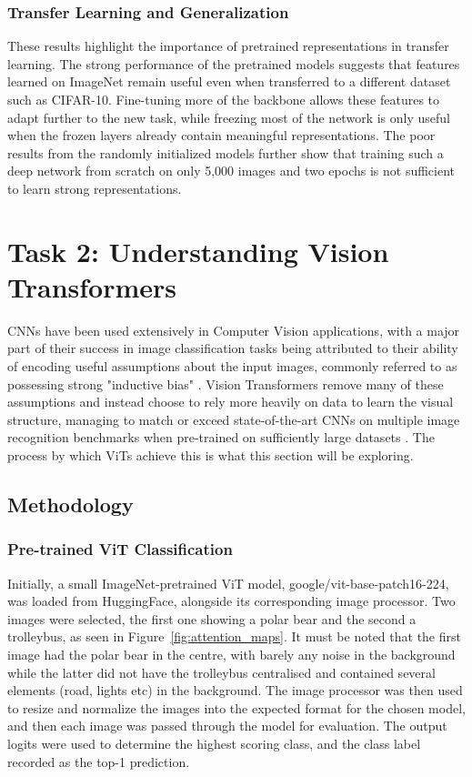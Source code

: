 \documentclass{article}
\begin{document}
\subsubsection{Transfer Learning and Generalization}
These results highlight the importance of pretrained representations in transfer learning. The strong performance of the pretrained models suggests that features learned on ImageNet remain useful even when transferred to a different dataset such as CIFAR-10. Fine-tuning more of the backbone allows these features to adapt further to the new task, while freezing most of the network is only useful when the frozen layers already contain meaningful representations. The poor results from the randomly initialized models further show that training such a deep network from scratch on only 5,000 images and two epochs is not sufficient to learn strong representations.


\section{Task 2: Understanding Vision Transformers}

CNNs have been used extensively in Computer Vision applications, with a major part of their success in image classification tasks being attributed to their ability of encoding useful assumptions about the input images, commonly referred to as possessing strong "inductive bias" \citep{dosovitskiy2021image}. Vision Transformers remove many of these assumptions and instead choose to rely more heavily on data to learn the visual structure, managing to match or exceed state-of-the-art CNNs on multiple image recognition benchmarks when pre-trained on sufficiently large datasets \citep{dosovitskiy2021image}. The process by which ViTs achieve this is what this section will be exploring.

\subsection{Methodology}

\subsubsection{Pre-trained ViT Classification}
Initially, a small ImageNet-pretrained ViT model, google/vit-base-patch16-224, was loaded from HuggingFace, alongside its corresponding image processor. Two images were selected, the first one showing a polar bear and the second a trolleybus, as seen in Figure~\ref{fig:attention_maps}. It must be noted that the first image had the polar bear in the centre, with barely any noise in the background while the latter did not have the trolleybus centralised and contained several elements (road, lights etc) in the background. The image processor was then used to resize and normalize the images into the expected format for the chosen model, and then each image was passed through the model for evaluation. The output logits were used to determine the highest scoring class, and the class label recorded as the top-1 prediction.
\end{document}
